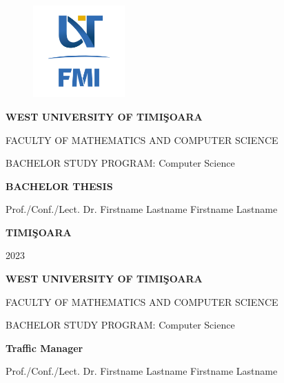 \documentclass[17pt]{article}
\begin{document}
\thispagestyle{empty}
\begin{center}
\begin{figure}[h!]
\vspace{-20pt}
\begin{center}
\includegraphics[width=100pt]{FMI-03.png}
\end{center}
\end{figure}


{\large{\bf WEST UNIVERSITY OF TIMI\c SOARA

FACULTY OF MATHEMATICS AND COMPUTER SCIENCE

BACHELOR STUDY PROGRAM: Computer Science}}

\vspace{120pt}
{\huge {\bf BACHELOR THESIS}}

\vspace{160pt}
\end{center}

{\large{}

\noindent Prof./Conf./Lect. Dr. Firstname Lastname \hfill 
\noindent  Firstname Lastname
}

\vfill
\begin{center}
{\bf TIMI\c SOARA

2023}
\end{center}
\newpage
\thispagestyle{empty}
\begin{center}
{\large{\bf WEST UNIVERSITY OF TIMI\c SOARA
		
FACULTY OF MATHEMATICS AND COMPUTER SCIENCE
		
BACHELOR STUDY PROGRAM:  Computer Science}}

\vspace{200pt}
{\huge {\bf Traffic Manager }}

\vspace{153pt}
\end{center}

{\large{}

\noindent Prof./Conf./Lect. Dr. Firstname  Lastname\hfill
\noindent Firstname  Lastname}
\end{document}
